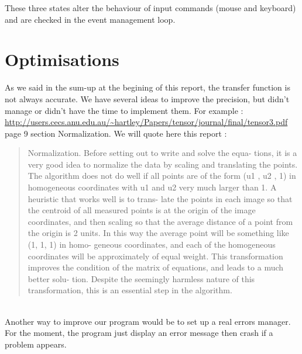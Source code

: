 \documentclass[a4paper,10pt]{report}
\begin{document}
These three states alter the behaviour of input commands (mouse and keyboard) and are checked in the event management loop.


\section{Optimisations}

As we said in the sum-up at the begining of this report, the transfer function is not always accurate.
We have several ideas to improve the precision, but didn't manage or didn't have the time to implement them. For example : \url{http://users.cecs.anu.edu.au/~hartley/Papers/tensor/journal/final/tensor3.pdf} page 9 section Normalization.
We will quote here this report :
\begin{quotation}
  Normalization. Before setting out to write and solve the equa-
  tions, it is a very good idea to normalize the data by scaling and
  translating the points. The algorithm does not do well if all points
  are of the form (u1 , u2 , 1) in homogeneous coordinates with u1 and
  u2 very much larger than 1. A heuristic that works well is to trans-
  late the points in each image so that the centroid of all measured
  points is at the origin of the image coordinates, and then scaling so
  that the average distance of a point from the origin is 2 units. In
  this way the average point will be something like (1, 1, 1) in homo-
  geneous coordinates, and each of the homogeneous coordinates will
  be approximately of equal weight. This transformation improves the
  condition of the matrix of equations, and leads to a much better solu-
  tion. Despite the seemingly harmless nature of this transformation,
  this is an essential step in the algorithm.
\end{quotation}
\\

Another way to improve our program would be to set up a real errors manager. For the moment, the program just
display an error message then crash if a problem appears.
\end{document}
